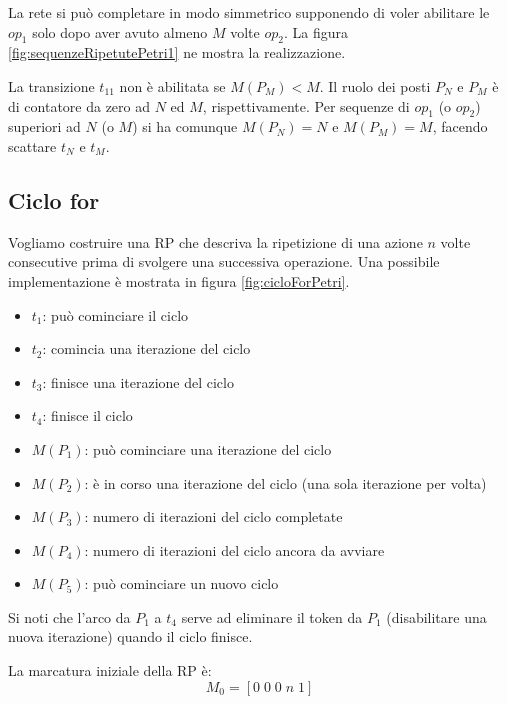 \documentclass[a4paper]{report}
\begin{document}
La rete si pu\`o completare in modo simmetrico supponendo di voler
abilitare le $op_1$ solo dopo aver avuto almeno $M$ volte $op_2$. La
figura \ref{fig:sequenzeRipetutePetri1} ne mostra la realizzazione.


La transizione $t_{11}$ non \`e abilitata se $M(P_M) < M$.
Il ruolo dei posti $P_N$ e $P_M$ \`e di contatore da zero ad $N$ ed
$M$, rispettivamente. Per sequenze di $op_1$ (o $op_2$) superiori ad
$N$ (o $M$) si ha comunque $M(P_N) = N$ e $M(P_M) = M$, facendo
scattare $t_N$ e $t_M$.

\subsection{Ciclo for}
Vogliamo costruire una RP che descriva la ripetizione di una azione
$n$ volte consecutive prima di svolgere una successiva operazione. Una
possibile implementazione \`e mostrata in figura
\ref{fig:cicloForPetri}.

\begin{itemize}
\item $t_1$: pu\`o cominciare il ciclo
\item $t_2$: comincia una iterazione del ciclo
\item $t_3$: finisce una iterazione del ciclo
\item $t_4$: finisce il ciclo
\item $M(P_1)$: pu\`o cominciare una iterazione del ciclo
\item $M(P_2)$: \`e in corso una iterazione del ciclo (una sola
  iterazione per volta)
\item $M(P_3)$: numero di iterazioni del ciclo completate
\item $M(P_4)$: numero di iterazioni del ciclo ancora da avviare
\item $M(P_5)$: pu\`o cominciare un nuovo ciclo
\end{itemize}

Si noti che l'arco da $P_1$ a $t_4$ serve ad eliminare il token da
$P_1$ (disabilitare una nuova iterazione) quando il ciclo finisce.

La marcatura iniziale della RP \`e:
\[
M_0 = [ 0\; 0\; 0\; n\; 1]
\]
\end{document}
